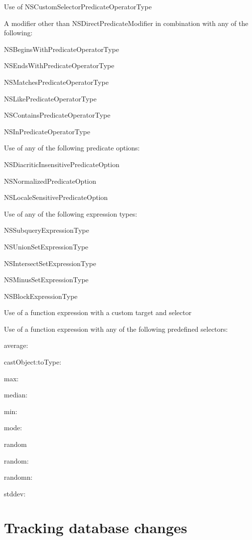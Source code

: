 \begin{DoxyItemize}
\item Use of N\+S\+Custom\+Selector\+Predicate\+Operator\+Type 
\item A modifier other than N\+S\+Direct\+Predicate\+Modifier in combination with any of the following\+: 
\begin{DoxyItemize}
\item N\+S\+Begins\+With\+Predicate\+Operator\+Type 
\item N\+S\+Ends\+With\+Predicate\+Operator\+Type 
\item N\+S\+Matches\+Predicate\+Operator\+Type 
\item N\+S\+Like\+Predicate\+Operator\+Type 
\item N\+S\+Contains\+Predicate\+Operator\+Type 
\item N\+S\+In\+Predicate\+Operator\+Type 
\end{DoxyItemize}
\item Use of any of the following predicate options\+: 
\begin{DoxyItemize}
\item N\+S\+Diacritic\+Insensitive\+Predicate\+Option 
\item N\+S\+Normalized\+Predicate\+Option 
\item N\+S\+Locale\+Sensitive\+Predicate\+Option 
\end{DoxyItemize}
\item Use of any of the following expression types\+: 
\begin{DoxyItemize}
\item N\+S\+Subquery\+Expression\+Type 
\item N\+S\+Union\+Set\+Expression\+Type 
\item N\+S\+Intersect\+Set\+Expression\+Type 
\item N\+S\+Minus\+Set\+Expression\+Type 
\item N\+S\+Block\+Expression\+Type 
\end{DoxyItemize}
\item Use of a function expression with a custom target and selector 
\item Use of a function expression with any of the following predefined selectors\+: 
\begin{DoxyItemize}
\item average\+: 
\item cast\+Object\+:to\+Type\+: 
\item max\+: 
\item median\+: 
\item min\+: 
\item mode\+: 
\item random 
\item random\+: 
\item randomn\+: 
\item stddev\+: 
\end{DoxyItemize}
\end{DoxyItemize}\hypertarget{tracking_changes}{}\section{Tracking database changes}\label{tracking_changes}
